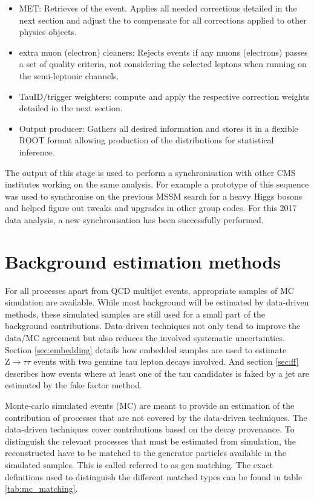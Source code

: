 \begin{itemize}
    \item MET: Retrieves \MET of the event. Applies all needed corrections detailed in the next section and adjust the \MET to compensate for all corrections applied to other physics objects.
    \item extra muon (electron) cleaners: Rejects events if any muons (electrons) passes a set of quality criteria, not considering the selected leptons when running on the semi-leptonic channels.
    \item TauID/trigger weighters: compute and apply the respective correction weights detailed in the next section.
    \item Output producer: Gathers all desired information and stores it in a flexible ROOT format allowing production of the distributions for statistical inference.
\end{itemize}

The output of this stage is used to perform a synchronisation with other CMS institutes working on the same analysis. For example a prototype of this sequence was used to synchronise on the previous MSSM search for a heavy Higgs bosons \cite{Aaboud2018} and helped figure out tweaks and upgrades in other group codes. For this 2017 data analysis, a new synchronisation has been successfully performed.


\section{Background estimation methods}
\label{sec:analysis_background_methods}

For all processes apart from QCD multijet events, appropriate samples of MC simulation are available. While most background will be estimated by data-driven methods, these simulated samples are still used for a small part of the background contributions. Data-driven techniques not only tend to improve the data/MC agreement but also reduces the involved systematic uncertainties. Section \ref{sec:embedding} details how embedded samples are used to estimate $\mathrm{Z} \rightarrow \tau\tau$ events with two genuine tau lepton decays involved. And section \ref{sec:ff} describes how events where at least one of the tau candidates is faked by a jet are estimated by the fake factor method.

Monte-carlo simulated events (MC) are meant to provide an estimation of the contribution of processes that are not covered by the data-driven techniques. The data-driven techniques cover contributions based on the \tauh decay provenance. To distinguish the relevant processes that must be estimated from simulation, the reconstructed \tauh have to be matched to the generator particles available in the simulated samples. This is called referred to as gen matching. The exact definitions used to distinguish the different matched types can be found in table \ref{tab:mc_matching}.

